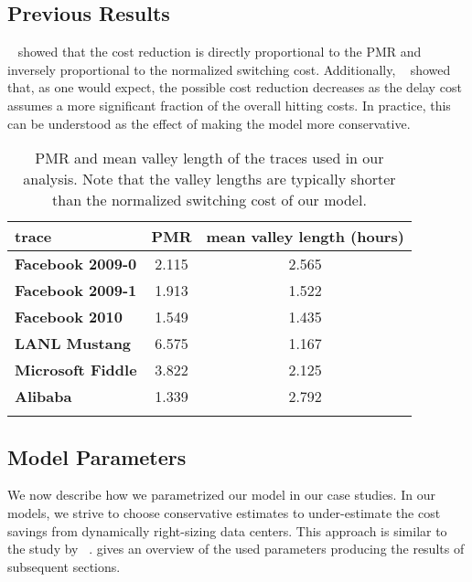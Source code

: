 \subsection{Previous Results}

\citeauthor{Lin2011}~\cite{Lin2011} showed that the cost reduction is directly proportional to the PMR and inversely proportional to the normalized switching cost. Additionally, \citeauthor{Lin2011}~\cite{Lin2011} showed that, as one would expect, the possible cost reduction decreases as the delay cost assumes a more significant fraction of the overall hitting costs. In practice, this can be understood as the effect of making the model more conservative.

\begin{table}
    \centering
    \begin{tabularx}{\textwidth}{>{\bfseries}l|c|c}
        trace & PMR & mean valley length (hours) \\\hline
        Facebook 2009-0 & 2.115 & 2.565 \\
        Facebook 2009-1 & 1.913 & 1.522 \\
        Facebook 2010 & 1.549 & 1.435 \\
        LANL Mustang & 6.575 & 1.167 \\
        Microsoft Fiddle & 3.822 & 2.125 \\
        Alibaba & 1.339 & 2.792 \\
    \caption{PMR and mean valley length of the traces used in our analysis. Note that the valley lengths are typically shorter than the normalized switching cost of our model.}
    \end{tabularx}
    \label{tab:pmr_vl}
\end{table}

\subsection{Model Parameters}\label{section:case_studies:traces:model-parameters}

We now describe how we parametrized our model in our case studies. In our models, we strive to choose conservative estimates to under-estimate the cost savings from dynamically right-sizing data centers. This approach is similar to the study by \citeauthor{Lin2011}~\cite{Lin2011}.  gives an overview of the used parameters producing the results of subsequent sections.

